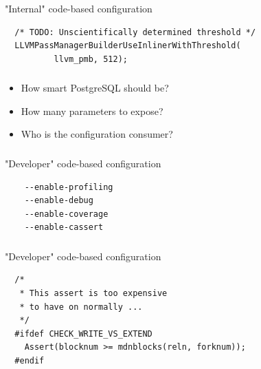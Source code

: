 \documentclass[usenames,dvipsnames, 18pt, compress, aspectratio=169]{beamer}
\begin{document}
\begin{frame}[fragile]{}
    \frametitle{}
    \begin{center}

        "Internal" code-based configuration

		\vspace{0.5cm}
        \begin{verbatim}
  /* TODO: Unscientifically determined threshold */
  LLVMPassManagerBuilderUseInlinerWithThreshold(
          llvm_pmb, 512);
        \end{verbatim}

    \end{center}
\end{frame}

\begin{frame}[fragile]{}
    \frametitle{}
    \begin{center}

        \begin{itemize}
            \item How smart PostgreSQL should be?
            \item How many parameters to expose?
            \item Who is the configuration consumer?
        \end{itemize}

    \end{center}
\end{frame}

\begin{frame}[fragile]{}
    \frametitle{}
    \begin{center}

        "Developer" code-based configuration

		\vspace{0.5cm}
        \begin{verbatim}
    --enable-profiling
    --enable-debug
    --enable-coverage
    --enable-cassert
        \end{verbatim}

    \end{center}
\end{frame}

\begin{frame}[fragile]{}
    \frametitle{}
    \begin{center}

        "Developer" code-based configuration

		\vspace{0.5cm}
        \begin{verbatim}
  /*
   * This assert is too expensive
   * to have on normally ...
   */
  #ifdef CHECK_WRITE_VS_EXTEND
    Assert(blocknum >= mdnblocks(reln, forknum));
  #endif
        \end{verbatim}

    \end{center}
\end{frame}
\end{document}
